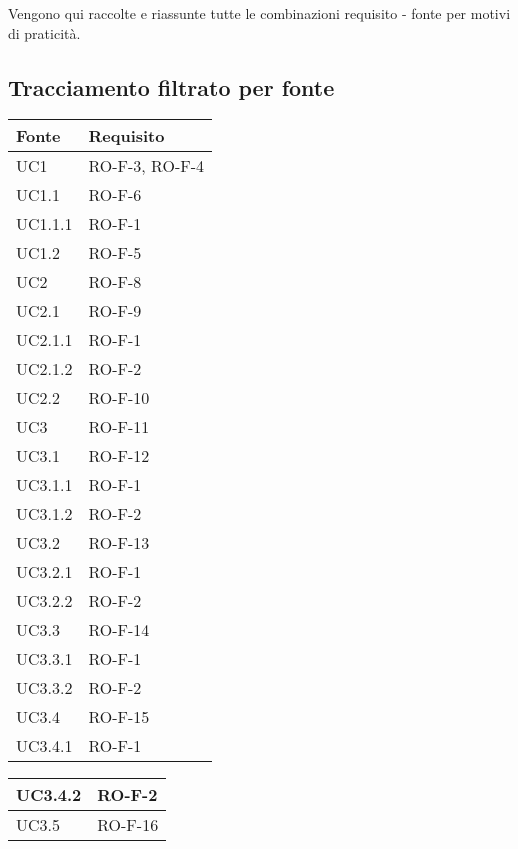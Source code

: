 Vengono qui raccolte e riassunte tutte le combinazioni requisito - fonte per motivi di praticità.
\subsection{Tracciamento filtrato per fonte}
\begin{center}
\renewcommand{\arraystretch}{1.8} %
\begin{tabular}{ |m{8em}|m{13em}| }
    \hline
    \textbf{Fonte} & \textbf{Requisito} \\
    \hline
    UC1         &   RO-F-3, RO-F-4 \\
    \hline
    UC1.1       &   RO-F-6 \\
    \hline
    UC1.1.1     &   RO-F-1 \\
    \hline
    UC1.2       &   RO-F-5 \\
    \hline
    UC2         &   RO-F-8 \\
    \hline
    UC2.1       &   RO-F-9 \\
    \hline
    UC2.1.1     &   RO-F-1 \\
    \hline
    UC2.1.2     &   RO-F-2 \\
    \hline
    UC2.2       &   RO-F-10 \\
    \hline
    UC3         &   RO-F-11 \\
    \hline
    UC3.1       &   RO-F-12 \\
    \hline
    UC3.1.1     &   RO-F-1 \\
    \hline
    UC3.1.2     &   RO-F-2 \\
    \hline
    UC3.2       &   RO-F-13 \\
    \hline
    UC3.2.1     &   RO-F-1 \\
    \hline
    UC3.2.2     &   RO-F-2 \\
    \hline
    UC3.3       &   RO-F-14 \\
    \hline
    UC3.3.1     &   RO-F-1 \\
    \hline
    UC3.3.2     &   RO-F-2 \\
    \hline
    UC3.4       &   RO-F-15 \\
    \hline
    UC3.4.1     &   RO-F-1 \\
    \hline
    \end{tabular}
    \newpage
    \begin{tabular}{ |m{8em}|m{13em}| }
    \hline
    UC3.4.2     &   RO-F-2 \\
    \hline
    UC3.5       &   RO-F-16 \\

\end{tabular}
\end{center}
